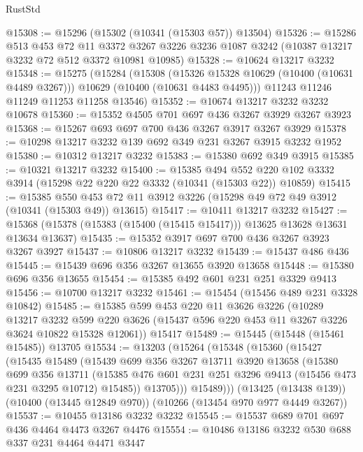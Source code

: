 \begin{lexlean}{RustStd}
\begin{coremodule}
{\begin{coremodule}
{{{{{{{{{{{{{{{{{{{{{{{{{@15308 := @15296 (@15302 (@10341 (@15303 @57)) @13504)
@15326 := @15286
    @513
    @453
    @72
    @11
    @3372
    @3267
    @3226
    @3236
    @1087
    @3242
    (@10387 @13217 @3232 @72 @512 @3372 @10981 @10985)
@15328 := @10624 @13217 @3232
@15348 := @15275
    (@15284
      (@15308
        (@15326 @15328 @10629 (@10400 (@10631 @4489 @3267)))
        @10629
        (@10400 (@10631 @4483 @4495)))
      @11243
      @11246
      @11249
      @11253
      @11258
      @13546)
@15352 := @10674 @13217 @3232 @3232 @10678
@15360 := @15352 @4505 @701 @697 @436 @3267 @3929 @3267 @3923
@15368 := @15267 @693 @697 @700 @436 @3267 @3917 @3267 @3929
@15378 := @10298 @13217 @3232 @139 @692 @349 @231 @3267 @3915 @3232 @1952
@15380 := @10312 @13217 @3232
@15383 := @15380 @692 @349 @3915
@15385 := @10321 @13217 @3232
@15400 := @15385
    @494
    @552
    @220
    @102
    @3332
    @3914
    (@15298 @22 @220 @22 @3332 (@10341 (@15303 @22)) @10859)
@15415 := @15385
    @550
    @453
    @72
    @11
    @3912
    @3226
    (@15298 @49 @72 @49 @3912 (@10341 (@15303 @49)) @13615)
@15417 := @10411 @13217 @3232
@15427 := @15368 (@15378 (@15383 (@15400 (@15415 @15417))) @13625 @13628 @13631 @13634 @13637)
@15435 := @15352 @3917 @697 @700 @436 @3267 @3923 @3267 @3927
@15437 := @10806 @13217 @3232
@15439 := @15437 @486 @436
@15445 := @15439 @696 @356 @3267 @13655 @3920 @13658
@15448 := @15380 @696 @356 @13655
@15454 := @15385 @492 @601 @231 @251 @3329 @9413
@15456 := @10700 @13217 @3232
@15461 := @15454 (@15456 @489 @231 @3328 @10842)
@15485 := @15385
    @599
    @453
    @220
    @11
    @3626
    @3226
    (@10289
      @13217
      @3232
      @599
      @220
      @3626
      (@15437 @596 @220 @453 @11 @3267 @3226 @3624 @10822 @15328 @12061))
    @15417
@15489 := @15445 (@15448 (@15461 @15485)) @13705
@15534 := @13203
    (@15264
      (@15348
        (@15360
          (@15427
            (@15435
              @15489
              (@15439
                @699
                @356
                @3267
                @13711
                @3920
                @13658
                (@15380
                  @699
                  @356
                  @13711
                  (@15385 @476 @601 @231 @251 @3296 @9413 (@15456 @473 @231 @3295 @10712) @15485))
                @13705)))
          @15489)))
    (@13425 (@13438 @139))
    (@10400 (@13445 @12849 @970))
    (@10266 (@13454 @970 @977 @4449 @3267))
@15537 := @10455 @13186 @3232 @3232
@15545 := @15537 @689 @701 @697 @436 @4464 @4473 @3267 @4476
@15554 := @10486 @13186 @3232 @530 @688 @337 @231 @4464 @4471 @3447
}}}}}}}}}}}}}}}}}}}}}}}}}
\end{coremodule}}
\end{coremodule}
\end{lexlean}
